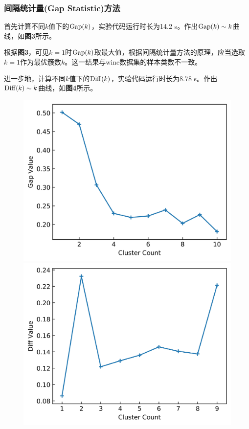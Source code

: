 \documentclass[12pt]{article}
\begin{document}
\subsubsection{间隔统计量(Gap Statistic)方法}
首先计算不同$k$值下的${\rm Gap}(k)$，实验代码运行时长为14.2 s。作出${\rm Gap}(k)\sim k$曲线，如\textbf{图3}所示。\par 
根据\textbf{图3}，可见$k=1$时${\rm Gap}(k)$取最大值，根据间隔统计量方法的原理，应当选取$k=1$作为最优簇数$k$。这一结果与wine数据集的样本类数不一致。\par 
进一步地，计算不同$k$值下的${\rm Diff}(k)$，实验代码运行时长为8.78 s。作出${\rm Diff}(k)\sim k$曲线，如\textbf{图4}所示。\par 
\begin{figure}[htbp]
	\centering
	\begin{minipage}[t]{0.49\textwidth}
		\centering
		\includegraphics[width=1\textwidth]{3.jpg}
	\end{minipage}
	\begin{minipage}[t]{0.49\textwidth}
		\centering
		\includegraphics[width=1\textwidth]{4.jpg}
	\end{minipage}
\end{figure}
\end{document}

